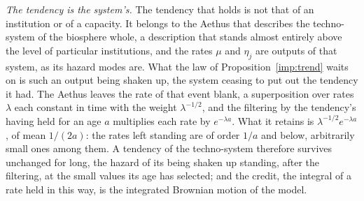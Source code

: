 \emph{The tendency is the system's.} The tendency that holds is not that
of an institution or of a capacity. It belongs to the Aethus that
describes the techno-system of the biosphere whole, a description that
stands almost entirely above the level of particular institutions, and
the rates $\mu$ and $\eta_j$ are outputs of that system, as its hazard
modes are. What the law of Proposition~\ref{imp:trend} waits on is such an output being
shaken up, the system ceasing to put out the tendency it had. The Aethus
leaves the rate of that event blank, a superposition over rates $\lambda$
each constant in time with the weight $\lambda^{-1/2}$, and the filtering
by the tendency's having held for an age $a$ multiplies each rate by
$e^{-\lambda a}$. What it retains is $\lambda^{-1/2}e^{-\lambda a}$, of
mean $1/(2a)$: the rates left standing are of order $1/a$ and below,
arbitrarily small ones among them. A tendency of the techno-system
therefore survives unchanged for long, the hazard of its being shaken up
standing, after the filtering, at the small values its age has selected;
and the credit, the integral of a rate held in this way, is the
integrated Brownian motion of the model.

